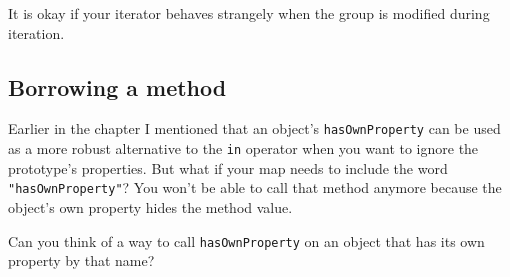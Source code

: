 It is okay if your iterator behaves strangely when the group is modified during iteration.

\subsection{Borrowing a method}

Earlier in the chapter I mentioned that an object's \lstinline`hasOwnProperty` can be used as a more robust alternative to the \lstinline`in` operator when you want to ignore the prototype's properties. But what if your map needs to include the word \lstinline`"hasOwnProperty"`? You won't be able to call that method anymore because the object's own property hides the method value.

Can you think of a way to call \lstinline`hasOwnProperty` on an object that has its own property by that name?

